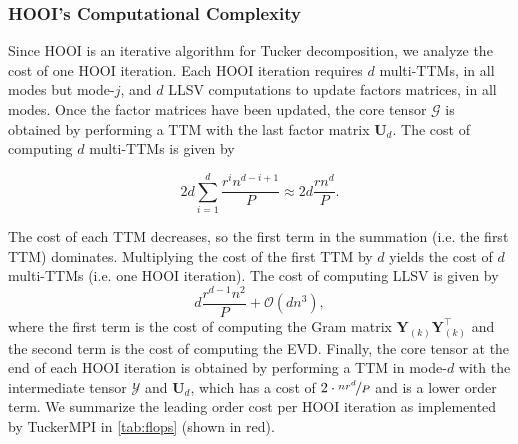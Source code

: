     \subsubsection{HOOI's Computational Complexity} \label{sec:HOOI's Computational Complexity}

        Since HOOI is an iterative algorithm for Tucker decomposition, we analyze the
        cost of one HOOI iteration. Each HOOI iteration requires $d$ multi-TTMs, in all
        modes but mode-$j$, and $d$ LLSV computations to update factors matrices, in all
        modes. Once the factor matrices have been updated, the core tensor $\mathcal{G}$ is
        obtained by performing a TTM with the last factor matrix $\mathbf{U}_{d}$. The cost
        of computing $d$ multi-TTMs is given by

        \begin{equation*}
            2d \sum_{i=1}^{d} \frac{r^i n^{d-i+1}}{P} \approx 2d\frac{rn^d}{P}.
        \end{equation*}

        The cost of each TTM decreases, so the first term in the summation (i.e. the
        first TTM) dominates. Multiplying the cost of the first TTM by $d$ yields the
        cost of $d$ multi-TTMs (i.e. one HOOI iteration). The cost of computing LLSV is
        given by
        \begin{equation*}
            d\frac{r^{d-1}n^2}{P} + \mathcal{O}(dn^3),
        \end{equation*}
        where the first term is the cost of computing the Gram matrix
        $\mathbf{Y}_{(k)}\mathbf{Y}_{(k)}^\intercal$ and the second term is the cost of
        computing the EVD. Finally, the core tensor at the end of each HOOI
        iteration is obtained by performing a TTM in mode-$d$ with the
        intermediate tensor $\mathcal{Y}$ and $\mathbf{U}_{d}$, which has a cost of
        $2\cdot \nicefrac{nr^{d}}{P}$ and is a lower order term. We summarize the
        leading order cost per HOOI iteration as implemented by TuckerMPI in
        \cref{tab:flops} (shown in red).


